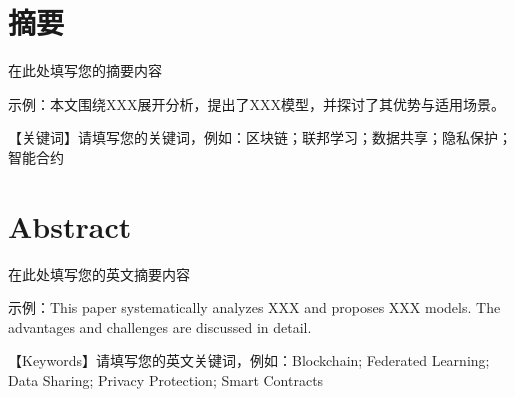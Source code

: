 \section*{摘要} %

在此处填写您的摘要内容

示例：本文围绕XXX展开分析，提出了XXX模型，并探讨了其优势与适用场景。

【关键词】请填写您的关键词，例如：区块链；联邦学习；数据共享；隐私保护；智能合约

\newpage %
\section*{Abstract} 

在此处填写您的英文摘要内容

示例：This paper systematically analyzes XXX and proposes XXX models. The advantages and challenges are discussed in detail.

【Keywords】请填写您的英文关键词，例如：Blockchain; Federated Learning; Data Sharing; Privacy Protection; Smart Contracts
